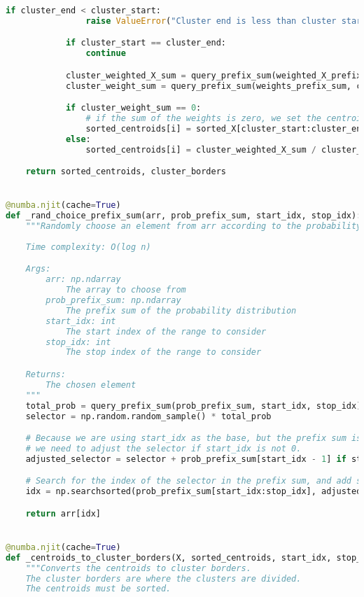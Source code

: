 \begin{lstlisting}[language=Python]
            if cluster_end < cluster_start:
                raise ValueError("Cluster end is less than cluster start")

            if cluster_start == cluster_end:
                continue

            cluster_weighted_X_sum = query_prefix_sum(weighted_X_prefix_sum, cluster_start, cluster_end)
            cluster_weight_sum = query_prefix_sum(weights_prefix_sum, cluster_start, cluster_end)

            if cluster_weight_sum == 0:
                # if the sum of the weights is zero, we set the centroid to the mean of the cluster
                sorted_centroids[i] = sorted_X[cluster_start:cluster_end].mean()
            else:
                sorted_centroids[i] = cluster_weighted_X_sum / cluster_weight_sum

    return sorted_centroids, cluster_borders


@numba.njit(cache=True)
def _rand_choice_prefix_sum(arr, prob_prefix_sum, start_idx, stop_idx):
    """Randomly choose an element from arr according to the probability distribution given by prob_prefix_sum
    
    Time complexity: O(log n)

    Args:
        arr: np.ndarray
            The array to choose from
        prob_prefix_sum: np.ndarray
            The prefix sum of the probability distribution
        start_idx: int
            The start index of the range to consider
        stop_idx: int
            The stop index of the range to consider

    Returns:
        The chosen element
    """
    total_prob = query_prefix_sum(prob_prefix_sum, start_idx, stop_idx)
    selector = np.random.random_sample() * total_prob

    # Because we are using start_idx as the base, but the prefix sum is calculated from 0,
    # we need to adjust the selector if start_idx is not 0.
    adjusted_selector = selector + prob_prefix_sum[start_idx - 1] if start_idx > 0 else selector

    # Search for the index of the selector in the prefix sum, and add start_idx to get the index in the original array
    idx = np.searchsorted(prob_prefix_sum[start_idx:stop_idx], adjusted_selector) + start_idx

    return arr[idx]


@numba.njit(cache=True)
def _centroids_to_cluster_borders(X, sorted_centroids, start_idx, stop_idx):
    """Converts the centroids to cluster borders.
    The cluster borders are where the clusters are divided.
    The centroids must be sorted.


\end{lstlisting}
